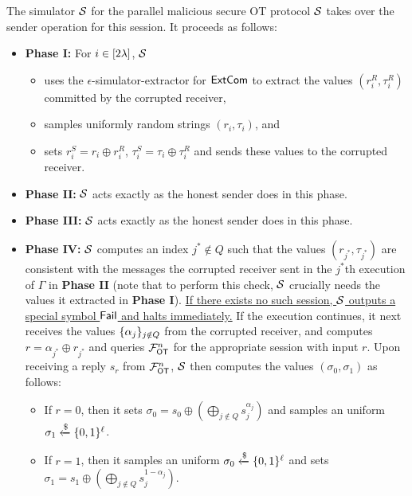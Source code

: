\begin{AlgorithmBox}[label={fig:OT-Sim}]{The simulator $\mathcal{S}$ for the parallel malicious secure OT protocol}
 $\mathcal{S}$ takes over the sender operation for this session. It proceeds as follows: 
\begin{itemize}
    \item {\bf Phase I:} For $i \in [2\lambda]$, $\mathcal{S}$ 
    \begin{itemize}
    \item
     uses the $\epsilon$-simulator-extractor for $\mathsf{ExtCom}$ to extract the values $(r_i^R,\tau_i^R)$ committed by the corrupted receiver, 
     \item
      samples uniformly random strings $(r_i,\tau_i)$, and 
      \item
      sets $r_i^S = r_i \oplus r_i^R$, $\tau_i^S = \tau_i \oplus \tau_i^R$ and sends these values to the corrupted receiver. 
    \end{itemize}
    \item {\bf Phase II:} $\mathcal{S}$ acts exactly as the honest sender does in this phase. 
    \item {\bf Phase III:} $\mathcal{S}$ acts exactly as the honest sender does in this phase.
    \item {\bf Phase IV:} $\mathcal{S}$ computes an index $j^* \notin Q$ such that the values $(r_{j^*},\tau_{j^*})$ are consistent with the messages the corrupted receiver sent in the $j^*$th execution of $\Gamma$ in {\bf Phase II} (note that to perform this check, $\mathcal{S}$ crucially needs the values it extracted in {\bf Phase I}). \underline{If there exists no such session, $\mathcal{S}$ outputs a special symbol $\mathsf{Fail}$ and halts immediately.} If the execution continues, it next receives the values $\{\alpha_j\}_{j \notin Q}$ from the corrupted receiver, and computes $r=\alpha_{j^*} \oplus r_{j^*}$ and queries $\mathcal{F}^n_\mathsf{OT}$ for the appropriate session with input $r$. Upon receiving a reply $s_r$ from $\mathcal{F}^n_\mathsf{OT}$, $\mathcal{S}$ then computes the values $(\sigma_0,\sigma_1)$ as follows: 
    \begin{itemize}
        \item If $r=0$, then it sets $\sigma_0 =  s_0 \oplus (\bigoplus_{j \notin Q} s_j^{\alpha_j})$ and samples an uniform $\sigma_1 \xleftarrow{\$} \{0,1\}^\ell$. 
        \item If $r=1$, then it samples an uniform $\sigma_0 \xleftarrow{\$} \{0,1\}^\ell$ and sets $\sigma_1 =  s_1 \oplus (\bigoplus_{j \notin Q} s_j^{1-\alpha_j})$. 
    \end{itemize}
\end{itemize}
\end{AlgorithmBox}

